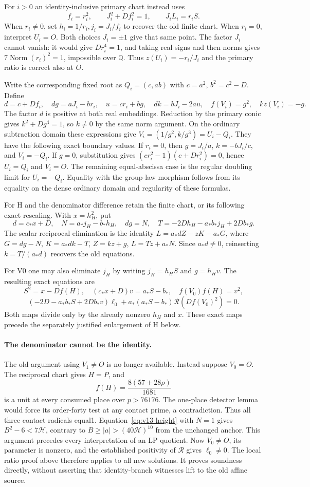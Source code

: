 For $i>0$ an identity-inclusive primary chart instead uses
\[
 f_i=r_i^2,\qquad J_i^2+Df_i^2=1,\qquad J_iL_i=r_iS.
\]
When $r_i\ne0$, set $h_i=1/r_i,j_i=J_i/f_i$ to recover the old
finite chart. When $r_i=0$, interpret $U_i=O$. Both choices $J_i=\pm1$
give that same point. The factor $J_i$ cannot vanish: it would give
$D r_i^4=1$, and taking real signs and then norms gives
$7\operatorname{Norm}(r_i)^2=1$, impossible over $\mathbb Q$.
Thus $z(U_i)=-r_i/J_i$ and the primary ratio is correct also at $O$.

Write the corresponding fixed root as $Q_i=(c,ab)$ with
$c=a^2$, $b^2=c^2-D$. Define
\[
 d=c+Df_i,\quad dg=aJ_i-br_i,\quad u=cr_i+bg,
 \quad dk=bJ_i-2au,\quad f(V_i)=g^2,\quad kz(V_i)=-g.
\]
The factor $d$ is positive at both real embeddings. Reduction by the
primary conic gives $k^2+Dg^4=1$, so $k\ne0$ by the same norm argument.
On the ordinary subtraction domain these expressions give
$V_i=(1/g^2,k/g^3)=U_i-Q_i$. They have the following exact boundary values.
If $r_i=0$, then $g=J_i/a$, $k=-bJ_i/c$, and $V_i=-Q_i$.
If $g=0$, substitution gives
$(cr_i^2-1)(c+Dr_i^2)=0$, hence $U_i=Q_i$ and $V_i=O$.
The remaining equal-abscissa case is the regular doubling limit for
$U_i=-Q_i$. Equality with the group-law morphism follows from its equality
on the dense ordinary domain and regularity of these formulas.

For H and the denominator difference retain the finite chart, or its
following exact rescaling. With $x=h_H^2$, put
\[
 d=c_*x+D,\quad N=a_*j_H-b_*h_H,\quad dg=N,
 \quad T=-2Dh_H-a_*b_*j_H+2Db_*g.
\]
The scalar reciprocal elimination is the identity
$L=a_*dZ-zK-a_*G$, where
$G=dg-N$, $K=a_*dk-T$, $Z=kz+g$, $L=Tz+a_*N$.
Since $a_*d\ne0$, reinserting $k=T/(a_*d)$ recovers the old equations.

For V0 one may also eliminate $j_H$ by writing $j_H=h_HS$ and $g=h_Hv$.
The resulting exact equations are
\[
 S^2=x-Df(H),\quad (c_*x+D)v=a_*S-b_*,\quad
 f(V_0)f(H)=v^2,
\]
\[
 (-2D-a_*b_*S+2Db_*v)\ell_0
       +a_*(a_*S-b_*)\mathcal R(Df(V_0)^2)=0.
\]
Both maps divide only by the already nonzero $h_H$ and $x$.
These exact maps precede the separately justified enlargement of H below.

\paragraph{The denominator cannot be the identity.}
The old argument using $V_1\ne O$ is no longer available. Instead suppose
$V_0=O$. The reciprocal chart gives $H=P$, and
\[
 f(H)=\frac{8(57+28\rho)}{1681}
\]
is a unit at every consumed place over $p>76176$. The one-place detector
lemma would force its order-forty test at any contact prime, a contradiction.
Thus all three contact radicals equal1. Equation~\eqref{eq:v13-height}
with $N=1$ gives $B^2-6<7\mathcal H$, contrary to
$B\ge|a|>(40\mathcal H)^{10}$ from the unchanged anchor.
This argument precedes every interpretation of an LP quotient.
Now $V_0\ne O$, its parameter is nonzero, and the established positivity
of $\mathcal R$ gives $\ell_0\ne0$. The local ratio proof above therefore
applies to all new solutions. It proves soundness directly, without
asserting that identity-branch witnesses lift to the old affine source.

